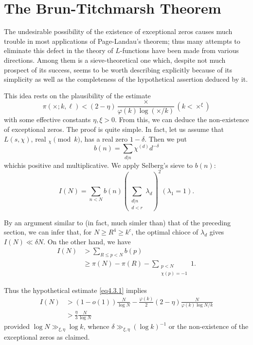 \section{The Brun-Titchmarsh Theorem}\label{chap4-sec4.3}%

The undesirable possibility of the existence of exceptional zeros
causes much trouble in most applications of Page-Landau's theorem;
thus many attempts to eliminate this defect in the theory of
$L$-functions have been made from various directions. Among them is a
sieve-theoretical one which, despite not much prospect of its
success, seems to be worth describing explicitly because of its
simplicity as well as the completeness of the hypothetical assertion
deduced by it. 

This idea rests on the plausibility of the estimate 
\begin{equation*}
  \pi (\times ; k, \ell ) < (2 -  \eta ) \frac{\times}{\varphi (k)
    \log (\times / k)} (k < \times^\xi ) \tag{4.3.1} \label{eq4.3.1}
\end{equation*}
with some effective constants $\eta, \xi > 0$. From this, we can deduce
the non-existence of exceptional zeros. The proof is quite simple. In
fact, let us assume that $L (s, \chi)$, real $_\chi \pmod{k}$, has a
real zero $1 - \delta$. Then we put  
$$
b (n) = \sum_{d|n} \chi^{(d)}d^{- \delta}
$$
which\pageoriginale is positive and multiplicative. We apply Selberg's sieve to $b(n)$: 
$$
I(N)= \sum_{n < N} b (n) \left(\sum_{\substack{d|n\\ d<r}}
\lambda_d\right)^2 (\lambda_1 = 1). 
$$

By an argument similar to (in fact, much simler than) that of the
preceding section, we can infer that, for $N \ge R^4 \ge k^c$, the
optimal chioce of $\lambda_d$ gives $I(N) \ll \delta N$. On the other
hand, we have 
\begin{align*}
 I(N) & > \sum_{R \le p < N} b(p)\\
 &\ge \pi (N) - \pi (R) - \sum_{\substack{ p<N\\ \chi(p) =-1}} 1.
\end{align*}

Thus the hypothetical estimate \eqref{eq4.3.1} implies
\begin{align*}
  I(N) & > (1- o(1)) \frac{N}{\log N} - \frac{\varphi(k)}{2} (2-\eta)
  \frac{N}{\varphi(k) \log N/k}\\ 
  & > \frac{\eta}{3} \frac{N}{\log N}
\end{align*}
provided $\log N \gg_{\xi,\eta} \log k$, whence $\delta \gg_{\xi,\eta}
(\log k)^{-1}$ or the non-existence of the exceptional zeros as
claimed.  

